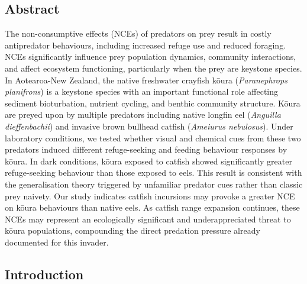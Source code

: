 \documentclass[
  letterpaper,
  DIV=11,
  numbers=noendperiod]{scrartcl}
\begin{document}
\subsection*{Abstract}\label{abstract}

The non-consumptive effects (NCEs) of predators on prey result in costly
antipredator behaviours, including increased refuge use and reduced
foraging. NCEs significantly influence prey population dynamics,
community interactions, and affect ecosystem functioning, particularly
when the prey are keystone species. In Aotearoa-New Zealand, the native
freshwater crayfish kōura (\emph{Paranephrops planifrons}) is a keystone
species with an important functional role affecting sediment
bioturbation, nutrient cycling, and benthic community structure. Kōura
are preyed upon by multiple predators including native longfin eel
(\emph{Anguilla dieffenbachii}) and invasive brown bullhead catfish
(\emph{Ameiurus nebulosus}). Under laboratory conditions, we tested
whether visual and chemical cues from these two predators induced
different refuge-seeking and feeding behaviour responses by kōura. In
dark conditions, kōura exposed to catfish showed significantly greater
refuge-seeking behaviour than those exposed to eels. This result is
consistent with the generalisation theory triggered by unfamiliar
predator cues rather than classic prey naivety. Our study indicates
catfish incursions may provoke a greater NCE on kōura behaviours than
native eels. As catfish range expansion continues, these NCEs may
represent an ecologically significant and underappreciated threat to
kōura populations, compounding the direct predation pressure already
documented for this invader.

\subsection{Introduction}\label{introduction}
\end{document}
